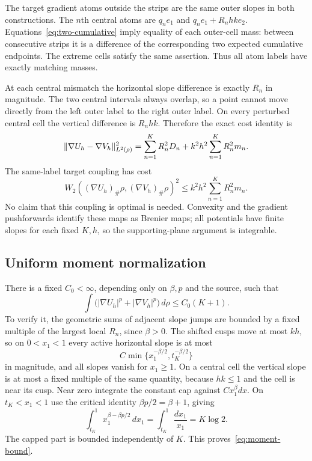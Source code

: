 \documentclass[11pt]{article}
\theoremstyle{remark}\newtheorem{remark}[theorem]{Remark}
\begin{document}
The target gradient atoms outside the strips are the same outer slopes in both constructions. The $n$th central atoms are
$q_ne_1$ and $q_ne_1+R_nhk e_2$. Equations~\eqref{eq:two-cumulative} imply equality of each outer-cell mass: between consecutive strips it is a difference of the corresponding two expected cumulative endpoints. The extreme cells satisfy the same assertion. Thus all atom labels have exactly matching masses.

At each central mismatch the horizontal slope difference is exactly $R_n$ in magnitude. The two central intervals always overlap, so a point cannot move directly from the left outer label to the right outer label. On every perturbed central cell the vertical difference is $R_nhk$. Therefore the exact cost identity is
\begin{equation}\label{eq:map-exact}
 \lVert\nabla U_h-\nabla V_h\rVert_{L^2(\rho)}^2
 =\sum_{n=1}^K R_n^2D_n
  +k^2h^2\sum_{n=1}^K R_n^2m_n.
\end{equation}
The same-label target coupling has cost
\begin{equation}\label{eq:coupling-upper}
 W_2((\nabla U_h)_\#\rho,(\nabla V_h)_\#\rho)^2
 \le k^2h^2\sum_{n=1}^K R_n^2m_n.
\end{equation}
No claim that this coupling is optimal is needed. Convexity and the gradient pushforwards identify these maps as Brenier maps; all potentials have finite slopes for each fixed $K,h$, so the supporting-plane argument is integrable.

\subsection{Uniform moment normalization}
There is a fixed $C_0<\infty$, depending only on $\beta,p$ and the source, such that
\begin{equation}\label{eq:moment-bound}
 \int\bigl(|\nabla U_h|^p+|\nabla V_h|^p\bigr)\,d\rho\le C_0(K+1).
\end{equation}
To verify it, the geometric sums of adjacent slope jumps are bounded by a fixed multiple of the largest local $R_n$, since $\beta>0$. The shifted cusps move at most $kh$, so on $0<x_1<1$ every active horizontal slope is at most
\[
 C\min\{x_1^{-\beta/2},t_K^{-\beta/2}\}
\]
in magnitude, and all slopes vanish for $x_1\ge1$. On a central cell the vertical slope is at most a fixed multiple of the same quantity, because $hk\le1$ and the cell is near its cusp. Near zero integrate the constant cap against $Cx_1^\beta dx$. On $t_K<x_1<1$ use the critical identity
$\beta p/2=\beta+1$, giving
\[
 \int_{t_K}^1 x_1^{\beta-\beta p/2}\,dx_1
 =\int_{t_K}^1\frac{dx_1}{x_1}=K\log2.
\]
The capped part is bounded independently of $K$. This proves~\eqref{eq:moment-bound}.
\end{document}
